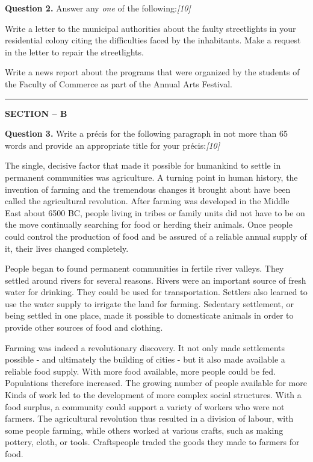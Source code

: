 \documentclass[11pt,a4paper]{article}
\newcommand{\pts}[1]{\hfill   \textit{[#1]}}
\begin{document}
\noindent   \textbf{Question 2.}
Answer any   \textit{one} of the following:\pts{10}

\begin{parts}
  \item Write a letter to the municipal authorities about the faulty streetlights in your residential colony citing the difficulties faced by the inhabitants. Make a request in the letter to repair the streetlights.
  \item Write a news report about the programs that were organized by the students of the Faculty of Commerce as part of the Annual Arts Festival.
\end{parts}

\medskip\rule{\linewidth}{0.2pt}


\newpage


\begin{center}
  {\bfseries SECTION -- B}
\end{center}




\noindent   \textbf{Question 3.}
Write a précis for the following paragraph in not more than 65 words and provide an appropriate title for your précis:\pts{10}

The single, decisive factor that made it possible for humankind to settle in permanent communities was agriculture. A turning point in human history, the invention of farming and the tremendous changes it brought about have been called the agricultural revolution. After farming was developed in the Middle East about 6500 BC, people living in tribes or family units did not have to be on the move continually searching for food or herding their animals. Once people could control the production of food and be assured of a reliable annual supply of it, their lives changed completely.

People began to found permanent communities in fertile river valleys. They settled around rivers for several reasons. Rivers were an important source of fresh water for drinking. They could be used for transportation. Settlers also learned to use the water supply to irrigate the land for farming. Sedentary settlement, or being settled in one place, made it possible to domesticate animals in order to provide other sources of food and clothing.

Farming was indeed a revolutionary discovery. It not only made settlements possible - and ultimately the building of cities - but it also made available a reliable food supply. With more food available, more people could be fed. Populations therefore increased. The growing number of people available for more Kinds of work led to the development of more complex social structures. With a food surplus, a community could support a variety of workers who were not farmers. The agricultural revolution thus resulted in a division of labour, with some people farming, while others worked at various crafts, such as making pottery, cloth, or tools. Craftspeople traded the goods they made to farmers for food.
\end{document}
